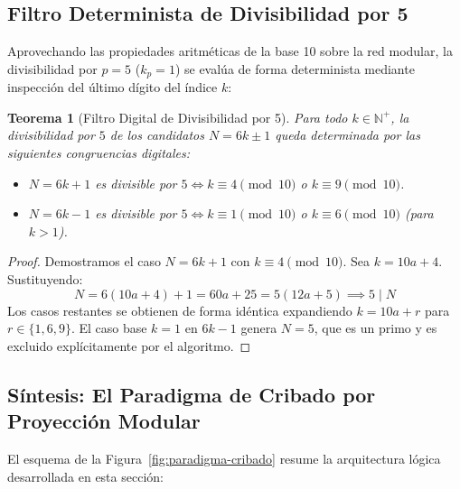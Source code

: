 \documentclass{article}
\numberwithin{equation}{section}
\theoremstyle{plain}
\newtheorem{theorem}{Teorema}[section]
\theoremstyle{definition}
\begin{document}
\subsection{Filtro Determinista de Divisibilidad por 5}
\label{sec:filtro-determinista}

Aprovechando las propiedades aritméticas de la base 10 sobre la red modular, la divisibilidad por $p=5$ ($k_p=1$) se evalúa de forma determinista mediante inspección del último dígito del índice $k$:

\begin{theorem}[Filtro Digital de Divisibilidad por 5]
\label{thm:filtro-5}
Para todo $k \in \mathbb{N}^+$, la divisibilidad por $5$ de los candidatos $N = 6k \pm 1$ queda determinada por las siguientes congruencias digitales:
\begin{itemize}
    \item $N = 6k + 1$ es divisible por $5 \iff k \equiv 4 \pmod{10}$ o $k \equiv 9 \pmod{10}$.
    \item $N = 6k - 1$ es divisible por $5 \iff k \equiv 1 \pmod{10}$ o $k \equiv 6 \pmod{10}$ (para $k > 1$).
\end{itemize}
\end{theorem}

\begin{proof}
Demostramos el caso $N = 6k + 1$ con $k \equiv 4 \pmod{10}$. Sea $k = 10a + 4$. Sustituyendo:
\begin{equation}
N = 6(10a + 4) + 1 = 60a + 25 = 5(12a + 5) \implies 5 \mid N
\end{equation}
Los casos restantes se obtienen de forma idéntica expandiendo $k = 10a + r$ para $r \in \{1, 6, 9\}$. El caso base $k=1$ en $6k-1$ genera $N=5$, que es un primo y es excluido explícitamente por el algoritmo.
\end{proof}

\subsection{Síntesis: El Paradigma de Cribado por Proyección Modular}

El esquema de la Figura~\ref{fig:paradigma-cribado} resume la arquitectura lógica desarrollada en esta sección:
\end{document}
